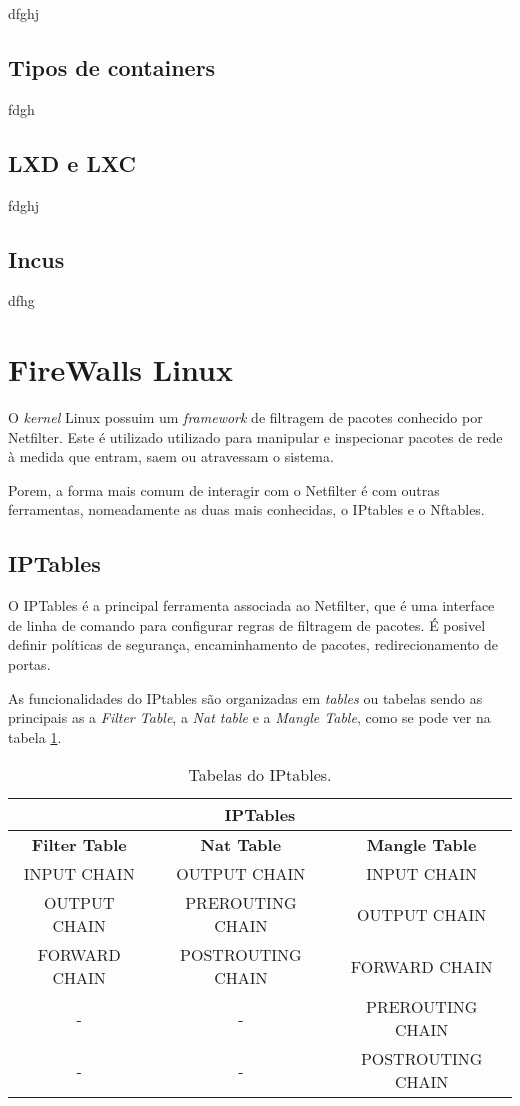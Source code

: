 dfghj

\subsection{Tipos de containers}

fdgh

\subsection{LXD e LXC}

fdghj

\subsection{Incus}

dfhg

\section{FireWalls Linux}

O \textit{kernel} Linux possuim um \textit{framework} de filtragem de pacotes 
conhecido por Netfilter. Este é utilizado utilizado para manipular e inspecionar 
pacotes de rede à medida que entram, saem ou atravessam o sistema.

Porem, a forma mais comum de interagir com o Netfilter é com outras ferramentas,
nomeadamente as duas mais conhecidas, o IPtables e o Nftables.

\subsection{IPTables}

O IPTables é a principal ferramenta associada ao Netfilter, que é uma interface
de linha de comando para configurar regras de filtragem de pacotes.
É posivel definir políticas de segurança, encaminhamento de pacotes,
redirecionamento de portas. 

As funcionalidades do IPtables são organizadas em \textit{tables} ou tabelas
sendo as principais as a \textit{Filter Table}, a \textit{Nat table} e a
\textit{Mangle Table}, como se pode ver na tabela \ref{ipt1}.

\begin{table}
\centering
\begin{tabular}{|c|c|c|}
\hline
\multicolumn{3}{|c|}{IPTables}\\
\hline
\rowcolor{yellow!50}\textbf{Filter Table} & \textbf{Nat Table} & \textbf{Mangle Table}\\
\hline
INPUT CHAIN & OUTPUT CHAIN & INPUT CHAIN\\
\hline
OUTPUT CHAIN & PREROUTING CHAIN & OUTPUT CHAIN\\
\hline
FORWARD CHAIN & POSTROUTING CHAIN & FORWARD CHAIN\\
\hline
- & - & PREROUTING CHAIN\\
\hline
- & - & POSTROUTING CHAIN\\
\hline
\end{tabular}
\caption{Tabelas do IPtables.}
\label{ipt1}
\end{table}


